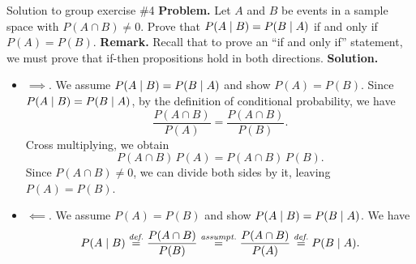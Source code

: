 \documentclass[10pt]{beamer}
\begin{document}
\begin{frame}{Solution to group exercise \#4}
\small 
\textbf{Problem.} Let $A$ and $B$ be events in a sample space with $P(A \cap B) \neq 0$.  Prove that $P(A \; | \; B) = P(B \; | \; A)$ if and only if $P(A) = P(B)$.
\vfill 
\vspace{-.1cm}
\textbf{Remark.} Recall that to prove an \enquote{if and only if} statement, we must prove that if-then propositions hold in both directions. 
\vfill 
\vspace{-.1cm}
\textbf{Solution.}
\begin{itemize}
\item $\boxed{\implies}$. We assume $P(A \; | \; B) = P(B \; | \; A)$  and show $P(A) = P(B)$.   Since $P(A \; | \; B) = P(B \; | \; A)$, by the definition of conditional probability, we have
\[ \frac{P(A \cap B)}{P(A)} =  \frac{P(A \cap B)}{P(B)}.\] 
 Cross multiplying, we obtain
 \[ P(A \cap B) \, P(A) =  P(A \cap B) \, P(B). \]
 Since $P(A \cap B) \neq 0$, we can divide both sides by it, leaving $P(A)=P(B)$. %
\item $\boxed{\impliedby}$. We assume $P(A) = P(B)$ and show $P(A \; | \; B) = P(B \; | \; A)$.   We have
%
\begin{align*}
P(A \; | \; B) 	\stackrel{\textit{def.}}{{=}}	 \frac{P(A \cap B)}{P(B)} \stackrel{\textit{assumpt.}}{{=}}	\frac{P(A \cap B)}{P(A)}\stackrel{\textit{def.}}{{=}}	P(B \; | \; A). 
\end{align*}

\end{itemize}

\end{frame}
\end{document}
